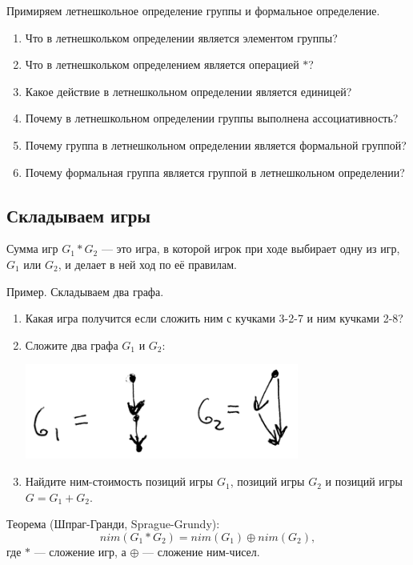 \documentclass[12pt]{article} %
\begin{document}
Примиряем летнешкольное определение группы и формальное определение.

\begin{enumerate}[resume]
\item Что в летнешкольком определении является элементом группы?
\item Что в летнешкольком определением является операцией $*$?
\item Какое действие в летнешкольном определении является единицей?
\item Почему в летнешкольном определении группы выполнена ассоциативность?
\item Почему группа в летнешкольном определении является формальной группой?
\item Почему формальная группа является группой в летнешкольном определении?
\end{enumerate}

\subsection{Складываем игры}

Сумма игр $G_1 * G_2$ — это игра, в которой игрок при ходе выбирает одну из игр, $G_1$ или $G_2$, и делает в ней ход по её правилам.

Пример. Складываем два графа.

\begin{enumerate}
  \item Какая игра получится если сложить ним с кучками 3-2-7 и ним кучками 2-8?
  \item Сложите два графа $G_1$ и $G_2$:
  \begin{minipage}[c]{0.5\textwidth}
  \centering
          \includegraphics[width=9cm]{figure/graph_sum.png}
  \end{minipage}

  \item Найдите ним-стоимость позиций игры $G_1$, позиций игры $G_2$ и позиций игры $G = G_1 + G_2$.
\end{enumerate}



Теорема (Шпраг-Гранди, Sprague-Grundy):
\[
nim(G_1 * G_2) = nim(G_1) \oplus nim(G_2),
\]
где $*$ — сложение игр, а $\oplus$ — сложение ним-чисел.
\end{document}
